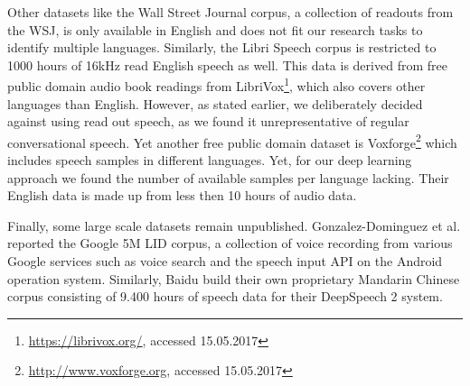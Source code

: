 Other datasets like the Wall Street Journal corpus\cite{charniak2000bllip}, a collection of readouts from the WSJ, is only available in English and does not fit our research tasks to identify multiple languages. Similarly, the Libri Speech corpus\cite{panayotov2015librispeech} is restricted to 1000 hours of 16kHz read English speech as well. This data is derived from free public domain  audio book readings from LibriVox\footnote{\url{https://librivox.org/}, accessed 15.05.2017}, which also covers other languages than English. However, as stated earlier, we deliberately decided against using read out speech, as we found it unrepresentative of regular conversational speech.  Yet another free public domain dataset is Voxforge\footnote{\url{http://www.voxforge.org}, accessed 15.05.2017} which includes speech samples in different languages. Yet, for our deep learning approach we found the number of available samples per language lacking. Their English data is made up from less then 10 hours of audio data.

Finally, some large scale datasets remain unpublished. Gonzalez-Dominguez et al.\cite{gonzalez2015frame, gonzalez2015real} reported the Google 5M LID corpus, a collection of voice recording from various Google services such as voice search and the speech input API on the Android operation system. Similarly, Baidu build their own proprietary Mandarin Chinese corpus consisting of 9.400 hours of speech data for their DeepSpeech 2 system\cite{amodei2015deep}.



